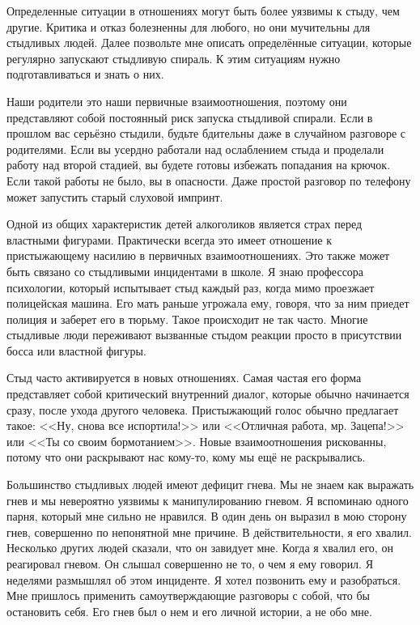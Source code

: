 \documentclass[10pt, fleqn]{article}
\begin{document}

Определенные ситуации в отношениях могут быть более уязвимы к стыду, чем другие. Критика и отказ болезненны для любого, но они мучительны для стыдливых людей. Далее позвольте мне описать определённые ситуации, которые регулярно запускают стыдливую спираль. К этим ситуациям нужно подготавливаться и знать о них.



Наши родители это наши первичные взаимоотношения, поэтому они представляют собой постоянный риск запуска стыдливой спирали. Если в прошлом вас серьёзно стыдили, будьте бдительны даже в случайном разговоре с родителями. Если вы усердно работали над ослаблением стыда и проделали работу над второй стадией, вы будете готовы избежать попадания на крючок. Если такой работы не было, вы в опасности. Даже простой разговор по телефону может запустить старый слуховой импринт.



Одной из общих характеристик детей алкоголиков является страх перед властными фигурами. Практически всегда это имеет отношение к пристыжающему насилию в первичных взаимоотношениях. Это также может быть связано со стыдливыми инцидентами в школе. Я знаю профессора психологии, который испытывает стыд каждый раз, когда мимо проезжает полицейская машина. Его мать раньше угрожала ему, говоря, что за ним приедет полиция и заберет его в тюрьму. Такое происходит не так часто. Многие стыдливые люди переживают вызванные стыдом реакции просто в присутствии босса или властной фигуры.


Стыд часто активируется в новых отношениях. Самая частая его форма представляет собой критический внутренний диалог, которые обычно начинается сразу, после ухода другого человека. Пристыжающий голос обычно предлагает такое: <<Ну, снова все испортила!>> или <<Отличная работа, мр. Зацепа!>> или <<Ты со своим бормотанием>>. Новые взаимоотношения рискованны, потому что они раскрывают нас кому-то, кому мы ещё не раскрывались.


Большинство стыдливых людей имеют дефицит гнева. Мы не знаем как выражать гнев и мы невероятно уязвимы к манипулированию гневом. Я вспоминаю одного парня, который мне сильно не нравился. В один день он выразил в мою сторону гнев, совершенно по непонятной мне причине. В действительности, я его хвалил. Несколько других людей сказали, что он завидует мне. Когда я хвалил его, он реагировал гневом. Он слышал совершенно не то, о чем я ему говорил. Я неделями размышлял об этом инциденте. Я хотел позвонить ему и разобраться. Мне пришлось применить самоутверждающие разговоры с собой, что бы остановить себя. Его гнев был о нем и его личной истории, а не обо мне.
\end{document}
